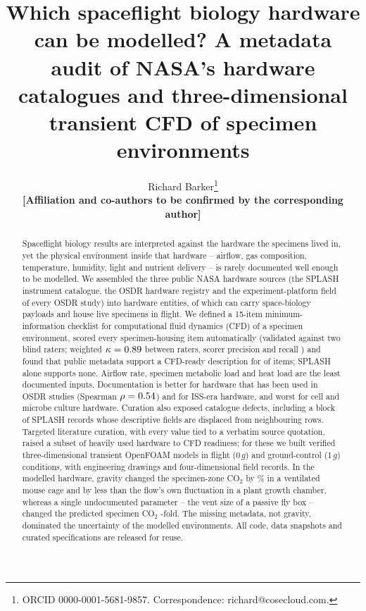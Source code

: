 \documentclass[11pt]{article}
\title{Which spaceflight biology hardware can be modelled? A metadata audit of NASA's hardware catalogues and three-dimensional transient CFD of specimen environments}
\author{Richard Barker\thanks{ORCID 0000-0001-5681-9857. Correspondence: richard@cosecloud.com.}\\
\small\textbf{[Affiliation and co-authors to be confirmed by the corresponding author]}}
\date{}
\begin{document}
\maketitle

\begin{abstract}
\noindent
Spaceflight biology results are interpreted against the hardware the specimens lived in, yet the
physical environment inside that hardware -- airflow, gas composition, temperature, humidity, light
and nutrient delivery -- is rarely documented well enough to be modelled. We assembled the three
public NASA hardware sources (the SPLASH instrument catalogue, the OSDR hardware registry and the
experiment-platform field of every OSDR study) into \hwNEntities{} hardware entities, of which
\hwNBioCapable{} can carry space-biology payloads and \hwNHabitats{} house live specimens in flight.
We defined a 15-item minimum-information checklist for computational fluid dynamics (CFD) of a
specimen environment, scored every specimen-housing item automatically (validated against two blind
raters; weighted $\kappa=0.89$ between raters, scorer precision \hwValPrecision{} and
recall \hwValRecall{}) and found that public metadata support a CFD-ready description for
\hwTierPublicTierA{} of \hwNHabitats{} items; SPLASH alone supports none. Airflow rate, specimen
metabolic load and heat load are the least documented inputs. Documentation is better for hardware
that has been used in OSDR studies (Spearman $\rho=0.54$) and for ISS-era hardware, and worst for
cell and microbe culture hardware. Curation also exposed catalogue defects, including a block of
\hwNSplashBlock{} SPLASH records whose descriptive fields are displaced from neighbouring rows.
Targeted literature curation, with every value tied to a verbatim source quotation, raised a subset of
heavily used hardware to CFD readiness; for these we built verified three-dimensional transient OpenFOAM
models in flight (0\,$g$) and ground-control (1\,$g$) conditions, with engineering drawings and
four-dimensional field records. In the modelled hardware, gravity changed the specimen-zone CO$_2$ by
\hwCfdMdsGravityDiffPct\% in a ventilated mouse cage and by less than the flow's own fluctuation in a plant
growth chamber, whereas a single undocumented parameter -- the vent size of a passive fly box -- changed the
predicted specimen CO$_2$ \hwCfdVfbCoRatio-fold. The missing metadata, not gravity, dominated the uncertainty
of the modelled environments. All code, data snapshots and curated specifications are released for reuse.
\end{abstract}
\end{document}
